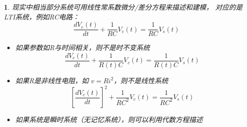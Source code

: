 \documentclass[UTF8]{report}
\theoremstyle{MyLineTheoremStyle} %
\theoremstyle{MyBlockTheoremStyle} %
\theoremstyle{MySubsubsectionStyle} %
\newtheorem{definition}{}
\begin{document}
\begin{definition}
    现实中相当部分系统可用线性常系数微分/差分方程来描述和建模，
    对应的是LTI系统，例如RC电路：
    \[
    \frac{dV_c(t)}{dt} + \frac{1}{RC} V_c(t) = \frac{1}{RC} V_s(t)
    \]
    \begin{itemize}
        \item 如果参数如R与时间相关，则不是时不变系统
        \[
        \frac{dV_c(t)}{dt} + \frac{1}{R\left(t\right)C} V_c(t) = \frac{1}{R\left(t\right)C}  V_s(t)
        \]
        \item 如果R是非线性电阻，如 $v = Ri^2$，则不是线性系统
        \[
        [\frac{dV_c(t)}{dt}]^2 + \frac{1}{RC^2} V_c(t) = \frac{1}{RC^2} V_s(t)
        \]
        \item 如果系统是瞬时系统（无记忆系统），则可以利用代数方程描述
    \end{itemize}
\end{definition}
\end{document}
